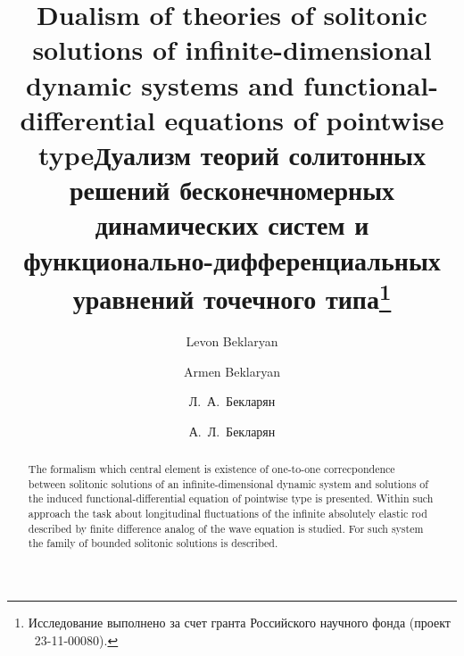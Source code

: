 \begin{englishtitle} %
\title{Dualism of theories of solitonic solutions of infinite-dimensional dynamic systems and functional- differential equations of pointwise type}
\author{Levon Beklaryan \and  Armen Beklaryan
}

\maketitle

\begin{abstract}
The formalism which central element is existence of one-to-one correcpondence  between solitonic solutions of an infinite-dimensional dynamic system and solutions of the induced functional-differential equation of pointwise type is presented. Within such approach the task about longitudinal fluctuations of the infinite absolutely elastic rod described  by finite  difference analog of the wave equation is studied. For such system the family of bounded solitonic solutions is described. 

\end{abstract}
\end{englishtitle}


\title{Дуализм теорий  солитонных решений бесконечномерных динамических систем и функционально-дифференциальных уравнений точечного типа\thanks{Исследование выполнено за счет гранта Российского научного фонда (проект \textnumero~23-11-00080).}}
\author{Л.~А.~Бекларян \and А.~Л.~Бекларян
}


